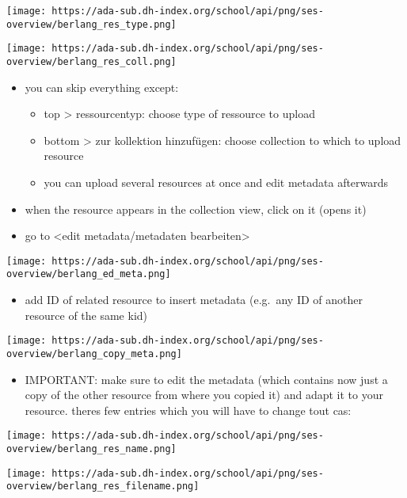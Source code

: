 \documentclass[
  12pt,
]{article}
\providecommand{\tightlist}{%
  \setlength{\itemsep}{0pt}\setlength{\parskip}{0pt}}
\begin{document}
\texttt{[image: https://ada-sub.dh-index.org/school/api/png/ses-overview/berlang\_res\_type.png]}

\texttt{[image: https://ada-sub.dh-index.org/school/api/png/ses-overview/berlang\_res\_coll.png]}

\begin{itemize}
\tightlist
\item
  you can skip everything except:

  \begin{itemize}
  \tightlist
  \item
    top \textgreater{} ressourcentyp: choose type of ressource to upload
  \item
    bottom \textgreater{} zur kollektion hinzufügen: choose collection
    to which to upload resource
  \item
    you can upload several resources at once and edit metadata
    afterwards
  \end{itemize}
\item
  when the resource appears in the collection view, click on it (opens
  it)
\item
  go to \textless edit metadata/metadaten bearbeiten\textgreater{}
\end{itemize}

\texttt{[image: https://ada-sub.dh-index.org/school/api/png/ses-overview/berlang\_ed\_meta.png]}

\begin{itemize}
\tightlist
\item
  add ID of related resource to insert metadata (e.g.~any ID of another
  resource of the same kid)
\end{itemize}

\texttt{[image: https://ada-sub.dh-index.org/school/api/png/ses-overview/berlang\_copy\_meta.png]}

\begin{itemize}
\tightlist
\item
  IMPORTANT: make sure to edit the metadata (which contains now just a
  copy of the other resource from where you copied it) and adapt it to
  your resource. theres few entries which you will have to change tout
  cas:
\end{itemize}

\texttt{[image: https://ada-sub.dh-index.org/school/api/png/ses-overview/berlang\_res\_name.png]}

\texttt{[image: https://ada-sub.dh-index.org/school/api/png/ses-overview/berlang\_res\_filename.png]}
\end{document}
